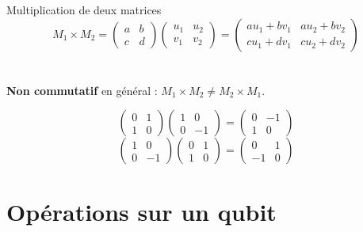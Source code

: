 \documentclass[aspectratio=169,12pt]{beamer}
\begin{document}
\begin{frame}{Multiplication de deux matrices}
  \[ M_1^{} \times M_2^{} = \begin{pmatrix}
      a & b \\
      c & d
    \end{pmatrix}
    \begin{pmatrix}
      u_1^{} & u_2^{} \\
      v_1^{} & v_2^{}
    \end{pmatrix}
    =
    \begin{pmatrix}
      au_1^{} + bv_1^{} & au_2^{} + bv_2^{} \\
      cu_1^{} + dv_1^{} & cu_2^{} + dv_2^{}
    \end{pmatrix}
  \]
  \\~\\
    \textbf{Non commutatif} en général : $M_1^{} \times M_2^{} \neq M_2^{} \times M_1^{}$.
  
  \bigskip
  \[
    \begin{pmatrix}
      0 & 1 \\
      1 & 0
    \end{pmatrix}
    \begin{pmatrix}
      1 & 0 \\
      0 & -1
    \end{pmatrix}
    =
    \begin{pmatrix}
      0 & -1 \\
      1 & 0
    \end{pmatrix}
      \]
  \bigskip
  \[
    \begin{pmatrix}
      1 & 0 \\
      0 & -1
    \end{pmatrix}
    \begin{pmatrix}
      0 & 1 \\
      1 & 0
    \end{pmatrix}
    =
    \begin{pmatrix}
      0 & 1 \\
      -1 & 0
    \end{pmatrix}
  \]
\end{frame}

\section{Opérations sur un qubit}
\end{document}
